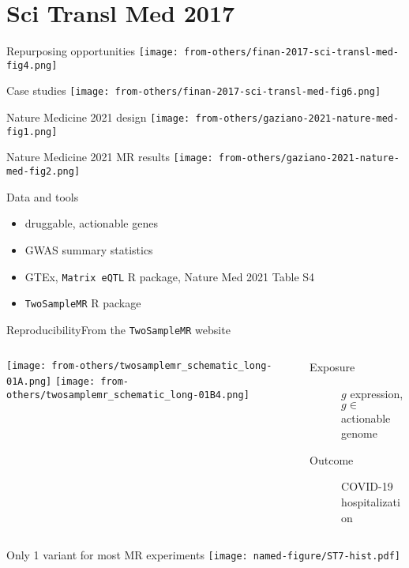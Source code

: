 \documentclass{beamer}
\begin{document}
\section{Sci Transl Med 2017}

\begin{frame}{Repurposing opportunities}
\texttt{[image: from-others/finan-2017-sci-transl-med-fig4.png]}
\end{frame}

\begin{frame}{Case studies}
\texttt{[image: from-others/finan-2017-sci-transl-med-fig6.png]}
\end{frame}

\begin{frame}{Nature Medicine 2021 design}
\texttt{[image: from-others/gaziano-2021-nature-med-fig1.png]}
\end{frame}

\begin{frame}{Nature Medicine 2021 MR results}
\texttt{[image: from-others/gaziano-2021-nature-med-fig2.png]}
\end{frame}

\begin{frame}{Data and tools}
\begin{itemize}
\item druggable, actionable genes
\item GWAS summary statistics
\item GTEx, \texttt{Matrix eQTL} R package, Nature Med 2021 Table S4
\item \texttt{TwoSampleMR} R package
\end{itemize}
\end{frame}

\begin{frame}{Reproducibility}{From the \texttt{TwoSampleMR} website}
\begin{columns}[t]
\begin{column}{0.7\textwidth}

\texttt{[image: from-others/twosamplemr\_schematic\_long-01A.png]}
\texttt{[image: from-others/twosamplemr\_schematic\_long-01B4.png]}
\end{column}

\begin{column}{0.5\textwidth}
\footnotesize
\begin{description}
\item[Exposure] $g$ expression, $g \in$ actionable genome
\item[Outcome] COVID-19 hospitalization
\end{description}
\end{column}
\end{columns}
\end{frame}

\begin{frame}{Only 1 variant for most MR experiments}
\texttt{[image: named-figure/ST7-hist.pdf]}
\end{frame}
\end{document}
